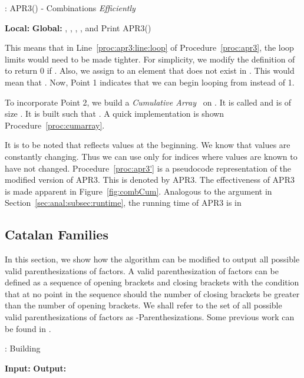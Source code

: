 \documentclass{article}
\begin{document}
\begin{algorithm}
\begin{algorithmic}[1]
\caption{: APR3() - Combinations \emph{Efficiently}}
\label{proc:apr3'}
\STATE \textbf{Local:} 
\STATE \textbf{Global:} , , , ,  and 
\medskip
\IF{}
	\STATE Print 
	\RETURN
\ELSE
	\STATE 
	\WHILE{}
		\IF{}
			\STATE  
			\STATE 
			\STATE APR3()
			\STATE 
		\ENDIF
		\STATE 
	\ENDWHILE
\ENDIF
\end{algorithmic}
\end{algorithm}

This means that in Line~\ref{proc:apr3:line:loop} of Procedure~\ref{proc:apr3}, the loop limits would need to be made tighter. For simplicity, we modify the definition of  to return 0 if . Also, we assign to  an element that does not exist in . This would mean that . Now, Point 1 indicates that we can begin looping from  instead of 1.

To incorporate Point 2, we build a \emph{Cumulative Array}~\cite{pearls} on . It is called  and is of size . It is built such that . A quick implementation is shown Procedure~\ref{proc:cumarray}.

It is to be noted that  reflects  values at the beginning. We know that  values are constantly changing. Thus we can use  only for indices where  values are known to have not changed. Procedure~\ref{proc:apr3'} is a pseudocode representation of the modified version of APR3. This is denoted by APR3. The effectiveness of APR3 is made apparent in Figure~\ref{fig:combCum}. Analogous to the argument in Section~\ref{sec:anal:subsec:runtime}, the running time of APR3 is in 

\subsection{Catalan Families}

In this section, we show how the algorithm can be modified to output all possible valid parenthesizations of  factors. A valid parenthesization of  factors can be defined as a sequence of  opening brackets and  closing brackets with the condition that at no point in the sequence should the number of closing brackets be greater than the number of opening brackets. We shall refer to the set of all possible valid parenthesizations of  factors as -Parenthesizations. Some previous work can be found in \cite{catalan2, knuth_perm}.

\begin{algorithm}
\caption{: Building }
\label{countCat}
\begin{algorithmic}[1]
\STATE \textbf{Input: }
\STATE \textbf{Output: }
\medskip
 \STATE 
 \STATE 
\end{algorithmic}
\end{algorithm}
\end{document}
